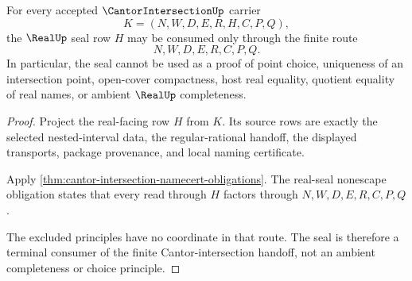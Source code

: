 \begin{theorem}
\label{thm:cantor-intersection-real-seal-nonescape}
For every accepted $\CantorIntersectionUp$ carrier
$$
K=(N,W,D,E,R,H,C,P,Q),
$$
the $\RealUp$ seal row $H$ may be consumed only through the finite route
$$
N,W,D,E,R,C,P,Q.
$$
In particular, the seal cannot be used as a proof of point choice, uniqueness of an intersection point, open-cover compactness, host real equality, quotient equality of real names, or ambient $\RealUp$ completeness.
\end{theorem}
\begin{proof}
Project the real-facing row $H$ from $K$. Its source rows are exactly the selected nested-interval data, the regular-rational handoff, the displayed transports, package provenance, and local naming certificate.

Apply \autoref{thm:cantor-intersection-namecert-obligations}. The real-seal nonescape obligation states that every read through $H$ factors through $N,W,D,E,R,C,P,Q$.

The excluded principles have no coordinate in that route. The seal is therefore a terminal consumer of the finite Cantor-intersection handoff, not an ambient completeness or choice principle.
\end{proof}

